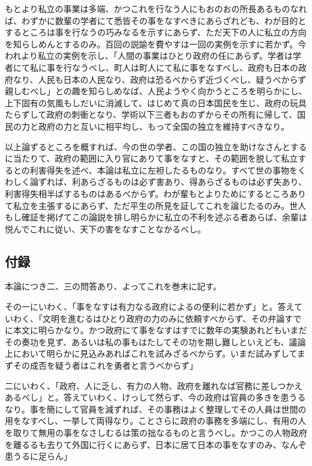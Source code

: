 \documentclass[a4paper, platex, dvipdfmx]{jsarticle}
\begin{document}
もとより私立の事業は多端、かつこれを行なう人にもおのおの所長あるものなれば、わずかに数輩の学者にて悉皆その事をなすべきにあらざれども、わが目的とするところは事を行なうの巧みなるを示すにあらず、ただ天下の人に私立の方向を知らしめんとするのみ。百回の説諭を費やすは一回の実例を示すに若かず。今われより私立の実例を示し、「人間の事業はひとり政府の任にあらず。学者は学者にて私に事を行なうべし、町人は町人にて私に事をなすべし、政府も日本の政府なり、人民も日本の人民なり、政府は恐るべからず近づくべし、疑うべからず親しむべし」との趣を知らしめなば、人民ようやく向かうところを明らかにし、上下固有の気風もしだいに消滅して、はじめて真の日本国民を生じ、政府の玩具たらずして政府の刺衝となり、学術以下三者もおのずからその所有に帰して、国民の力と政府の力と互いに相平均し、もって全国の独立を維持すべきなり。

以上論ずるところを概すれば、今の世の学者、この国の独立を助けなさんとするに当たりて、政府の範囲に入り官にありて事をなすと、その範囲を脱して私立するとの利害得失を述べ、本論は私立に左袒したるものなり。すべて世の事物をくわしく論ずれば、利あらざるものは必ず害あり、得あらざるものは必ず失あり、利害得失相半ばするものはあるべからず。わが輩もとよりためにするところありて私立を主張するにあらず、ただ平生の所見を証してこれを論じたるのみ。世人もし確証を掲げてこの論説を排し明らかに私立の不利を述ぶる者あらば、余輩は悦んでこれに従い、天下の害をなすことなかるべし。

\subsection{付録}
本論につき二、三の問答あり、よってこれを巻末に記す。

その一にいわく、「事をなすは有力なる政府によるの便利に若かず」と。答えていわく、「文明を進むるはひとり政府の力のみに依頼すべからず、その弁論すでに本文に明らかなり。かつ政府にて事をなすはすでに数年の実験あれどもいまだその奏功を見ず、あるいは私の事もはたしてその功を期し難しといえども、議論上において明らかに見込みあればこれを試みざるべからず。いまだ試みずしてまずその成否を疑う者はこれを勇者と言うべからず」

二にいわく、「政府、人に乏し、有力の人物、政府を離れなば官務に差しつかえあるべし」と。答えていわく、けっして然らず、今の政府は官員の多きを患うるなり。事を簡にして官員を減ずれば、その事務はよく整理してその人員は世間の用をなすべし、一挙して両得なり。ことさらに政府の事務を多端にし、有用の人を取りて無用の事をなさしむるは策の拙なるものと言うべし。かつこの人物政府を離るるも去りて外国に行くにあらず、日本に居て日本の事をなすのみ、なんぞ患うるに足らん」
\end{document}
